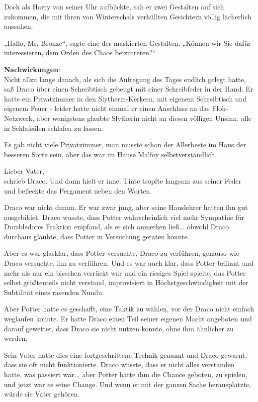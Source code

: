 {Doch als Harry von seiner Uhr aufblickte, sah er zwei Gestalten auf sich zukommen, die mit ihren von Winterschals verhüllten Gesichtern völlig lächerlich aussahen.

„Hallo, Mr. Bronze“, sagte eine der maskierten Gestalten. „Können wir Sie dafür interessieren, dem Orden des Chaos beizutreten?“

\textbf{Nachwirkungen}:\\ Nicht allzu lange danach, als sich die Aufregung des Tages endlich gelegt hatte, saß Draco über einen Schreibtisch gebeugt mit einer Schreibfeder in der Hand. Er hatte ein Privatzimmer in den Slytherin-Kerkern, mit eigenem Schreibtisch und eigenem Feuer - leider hatte nicht einmal er einen Anschluss an das Floh-Netzwerk, aber wenigstens glaubte Slytherin nicht an diesen völligen Unsinn, alle in Schlafsälen schlafen zu lassen.

Es gab nicht viele Privatzimmer, man musste schon der Allerbeste im Haus der besseren Sorte sein, aber das war im Hause Malfoy selbstverständlich.

Lieber Vater,\\ schrieb Draco. Und dann hielt er inne. Tinte tropfte langsam aus seiner Feder und befleckte das Pergament neben den Worten.

Draco war nicht dumm. Er war zwar jung, aber seine Hauslehrer hatten ihn gut ausgebildet. Draco wusste, dass Potter wahrscheinlich viel mehr Sympathie für Dumbledores Fraktion empfand, als er sich anmerken ließ... obwohl Draco durchaus glaubte, dass Potter in Versuchung geraten könnte.

Aber es war glasklar, dass Potter versuchte, Draco zu verführen, genauso wie Draco versuchte, ihn zu verführen. Und es war auch klar, dass Potter brillant und mehr als nur ein bisschen verrückt war und ein riesiges Spiel spielte, das Potter selbst größtenteils nicht verstand, improvisiert in Höchstgeschwindigkeit mit der Subtilität eines rasenden Nundu.

Aber Potter hatte es geschafft, eine Taktik zu wählen, vor der Draco nicht einfach weglaufen konnte. Er hatte Draco einen Teil seiner eigenen Macht angeboten und darauf gewettet, dass Draco sie nicht nutzen konnte, ohne ihm ähnlicher zu werden.

Sein Vater hatte dies eine fortgeschrittene Technik genannt und Draco gewarnt, dass sie oft nicht funktionierte. Draco wusste, dass er nicht alles verstanden hatte, was passiert war... aber Potter hatte ihm die Chance geboten, zu spielen, und jetzt war es seine Change. Und wenn er mit der ganzen Sache herausplatzte, würde sie Vater gehören.

}
